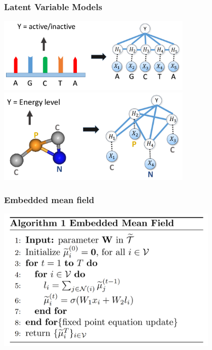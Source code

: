 \documentclass{beamer}
\begin{document}
    \begin{frame}
        \frametitle{Latent Variable Models}
        \begin{center}
            \includegraphics[width=0.7\textwidth]{string_lvm.png}
            \includegraphics[width=0.7\textwidth]{graph_lvm.png}
        \end{center}
    \end{frame}

    \begin{frame}
        \frametitle{Embedded mean field}
        \begin{center}
            \includegraphics[width=0.8\textwidth]{emf.png}
        \end{center}
    \end{frame}
\end{document}
